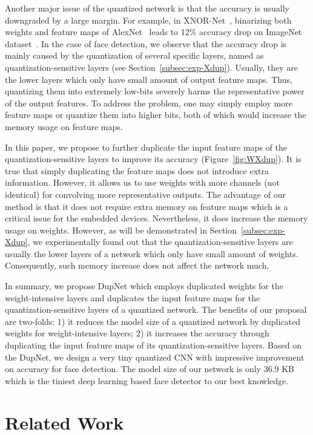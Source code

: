 \documentclass[10pt,twocolumn,letterpaper]{article}
\begin{document}
Another major issue of the quantized network is that the accuracy is usually downgraded by a large margin. For example, in XNOR-Net~\cite{XNOR}, binarizing both weights and feature maps of AlexNet~\cite{AlexNet} leads to 12\% accuracy drop on ImageNet dataset~\cite{ImageNet}. In the case of face detection, we observe that the accuracy drop is mainly caused by the quantization of several specific layers, named as quantization-sensitive layers (see Section~\ref{subsec:exp-Xdup}). Usually, they are the lower layers which only have small amount of output feature maps. Thus, quantizing them into extremely low-bits severely harms the representative power of the output features. To address the problem, one may simply employ more feature maps or quantize them into higher bits, both of which would increase the memory usage on feature maps.

In this paper, we propose to further duplicate the input feature maps of the quantization-sensitive layers to improve its accuracy (Figure~\ref{fig:WXdup}). It is true that simply duplicating the feature maps does not introduce extra information. However, it allows us to use weights with more channels (not identical) for convolving more representative outputs. The advantage of our method is that it does not require extra memory on feature maps which is a critical issue for the embedded devices. Nevertheless, it does increase the memory usage on weights. However, as will be demonstrated in Section~\ref{subsec:exp-Xdup}, we experimentally found out that the quantization-sensitive layers are usually the lower layers of a network which only have small amount of weights. Consequently, such memory increase does not affect the network much. 

In summary, we propose DupNet which employs duplicated weights for the weight-intensive layers and duplicates the input feature maps for the quantization-sensitive layers of a quantized network. The benefits of our proposal are two-folds: 1) it reduces the model size of a quantized network by duplicated weights for weight-intensive layers; 2) it increases the accuracy through duplicating the input feature maps of its quantization-sensitive layers. Based on the DupNet, we design a very tiny quantized CNN with impressive improvement on accuracy for face detection. The model size of our network is only 36.9 KB which is the tiniest deep learning based face detector to our best knowledge.





\section{Related Work}\label{sec:RelatedWork}
\end{document}

